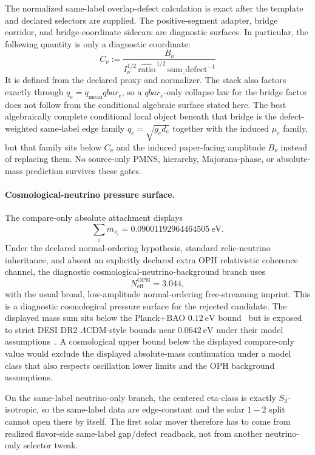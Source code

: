 \documentclass[11pt]{article}
\begin{document}
The normalized same-label overlap-defect calculation is exact after the template and declared
selectors are supplied. The positive-segment adapter, bridge corridor, and bridge-coordinate
sidecars are diagnostic surfaces. In particular, the following quantity is only a diagnostic
coordinate:
\[
C_\nu:=\frac{B_\nu}{I_\nu^{1/2}\,\widehat{\mathrm{ratio}}^{\,1/2}\,\mathrm{sum\_defect}^{-1}}
\]
It is defined from the declared proxy and normalizer. The stack also factors exactly through
\(q_e = q_{\mathrm{mean}} qbar_e\), so a \(qbar_e\)-only collapse law for the bridge factor does
not follow from the conditional algebraic surface stated here. The best algebraically complete
conditional local object beneath that bridge is the
defect-weighted same-label edge family \(q_e=\sqrt{g_e d_e}\) together with the induced
\(\mu_e\) family, but that family sits below \(C_\nu\) and the induced paper-facing amplitude \(B_\nu\) instead of replacing them.
No source-only PMNS, hierarchy, Majorana-phase, or absolute-mass prediction survives these gates.

\paragraph{Cosmological-neutrino pressure surface.}
The compare-only absolute attachment displays
\[
\sum_i m_{\nu_i}
=
0.09001192964464505~\mathrm{eV}.
\]
Under the declared normal-ordering hypothesis, standard relic-neutrino inheritance, and absent an
explicitly declared extra OPH relativistic coherence channel, the diagnostic
cosmological-neutrino-background branch uses
\[
N_{\mathrm{eff}}^{\mathrm{OPH}}=3.044,
\]
with the usual broad, low-amplitude normal-ordering free-streaming imprint. This is a diagnostic
cosmological pressure surface for the rejected candidate.
The displayed mass sum sits below the Planck+BAO \(0.12~\mathrm{eV}\) bound~\cite{planck18} but is
exposed to strict DESI DR2 \(\Lambda\)CDM-style bounds near \(0.0642~\mathrm{eV}\) under their
model assumptions~\cite{desidr2nu}. A cosmological upper bound below the displayed compare-only value would
exclude the displayed absolute-mass continuation under a model class that also respects
oscillation lower limits and the OPH background assumptions.

On the same-label neutrino-only branch, the centered eta-class is exactly \(S_3\)-isotropic, so
the same-label data are edge-constant and the solar \(1\!-\!2\) split cannot open there by itself.
The first solar mover therefore has to come from realized flavor-side same-label gap/defect
readback, not from another neutrino-only selector tweak.
\end{document}
